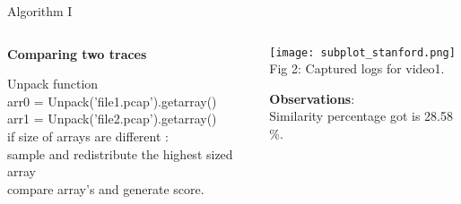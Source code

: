 \documentclass{beamer}
\begin{document}
\begin{frame}{Algorithm I}
\begin{columns}
\begin{column}{0.5\textwidth}
        \begin{algorithm}
            \scriptsize
            \hline
            \caption{\textbf{Comparing two traces}}\label{alg:cap}
            \hline
            \begin{algorithmic}
            \Require Unpack function
            \\
                \hspace{1em} arr0 = Unpack('file1.pcap').getarray() \\
                \hspace{1em} arr1 = Unpack('file2.pcap').getarray() \\
                \hspace{1em} if size of arrays are different : \\
                \hspace{2em} sample and redistribute the highest sized array \\
                \hspace{1em} compare array's and generate score.
            \end{algorithmic}
        \end{algorithm}
        \hline
        \end{column}
        \begin{column}{0.5\textwidth}
            \begin{center}
                \texttt{[image: subplot\_stanford.png]} \\
                \footnotesize Fig 2: Captured logs for video1.
            \end{center}
            \vspace{0.3em}
            \textbf{Observations}: \\
            Similarity percentage got is 28.58 \%.
        \end{column}
    \end{columns}
\end{frame}
\end{document}
